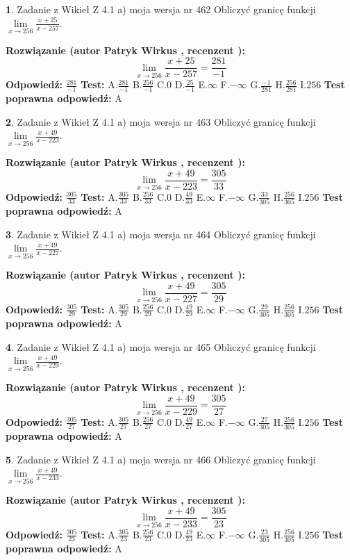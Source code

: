 \documentclass[12pt, a4paper]{article}
\theoremstyle{definition} %
\newtheorem{zad}{}
\newcommand{\zadStart}[1]{\begin{zad}#1\newline}
\newcommand{\zadStop}{\end{zad}}
\newcommand{\rozwStart}[2]{\noindent \textbf{Rozwiązanie (autor #1 , recenzent #2): }\newline}
\newcommand{\rozwStop}{\newline}
\newcommand{\odpStart}{\noindent \textbf{Odpowiedź:}\newline}
\newcommand{\odpStop}{\newline}
\newcommand{\testStart}{\noindent \textbf{Test:}\newline}
\newcommand{\testStop}{\newline}
\newcommand{\kluczStart}{\noindent \textbf{Test poprawna odpowiedź:}\newline}
\newcommand{\kluczStop}{\newline}
\begin{document}
\zadStart{Zadanie z Wikieł Z 4.1 a) moja wersja nr 462}
Obliczyć granicę funkcji $\lim\limits_{x\to256}\frac{x+25}{x-257}$.
\zadStop
\rozwStart{Patryk Wirkus}{}
$$\lim\limits_{x\to256}\frac{x+25}{x-257} = \frac{281}{-1}$$
\rozwStop
\odpStart
$\frac{281}{-1}$
\odpStop
\testStart
A.$\frac{281}{-1}$
B.$\frac{256}{-1}$
C.$0$
D.$\frac{25}{-1}$
E.$\infty$
F.$-\infty$
G.$\frac{-1}{281}$
H.$\frac{256}{281}$
I.$256$
\testStop
\kluczStart
A
\kluczStop



\zadStart{Zadanie z Wikieł Z 4.1 a) moja wersja nr 463}
Obliczyć granicę funkcji $\lim\limits_{x\to256}\frac{x+49}{x-223}$.
\zadStop
\rozwStart{Patryk Wirkus}{}
$$\lim\limits_{x\to256}\frac{x+49}{x-223} = \frac{305}{33}$$
\rozwStop
\odpStart
$\frac{305}{33}$
\odpStop
\testStart
A.$\frac{305}{33}$
B.$\frac{256}{33}$
C.$0$
D.$\frac{49}{33}$
E.$\infty$
F.$-\infty$
G.$\frac{33}{305}$
H.$\frac{256}{305}$
I.$256$
\testStop
\kluczStart
A
\kluczStop



\zadStart{Zadanie z Wikieł Z 4.1 a) moja wersja nr 464}
Obliczyć granicę funkcji $\lim\limits_{x\to256}\frac{x+49}{x-227}$.
\zadStop
\rozwStart{Patryk Wirkus}{}
$$\lim\limits_{x\to256}\frac{x+49}{x-227} = \frac{305}{29}$$
\rozwStop
\odpStart
$\frac{305}{29}$
\odpStop
\testStart
A.$\frac{305}{29}$
B.$\frac{256}{29}$
C.$0$
D.$\frac{49}{29}$
E.$\infty$
F.$-\infty$
G.$\frac{29}{305}$
H.$\frac{256}{305}$
I.$256$
\testStop
\kluczStart
A
\kluczStop



\zadStart{Zadanie z Wikieł Z 4.1 a) moja wersja nr 465}
Obliczyć granicę funkcji $\lim\limits_{x\to256}\frac{x+49}{x-229}$.
\zadStop
\rozwStart{Patryk Wirkus}{}
$$\lim\limits_{x\to256}\frac{x+49}{x-229} = \frac{305}{27}$$
\rozwStop
\odpStart
$\frac{305}{27}$
\odpStop
\testStart
A.$\frac{305}{27}$
B.$\frac{256}{27}$
C.$0$
D.$\frac{49}{27}$
E.$\infty$
F.$-\infty$
G.$\frac{27}{305}$
H.$\frac{256}{305}$
I.$256$
\testStop
\kluczStart
A
\kluczStop



\zadStart{Zadanie z Wikieł Z 4.1 a) moja wersja nr 466}
Obliczyć granicę funkcji $\lim\limits_{x\to256}\frac{x+49}{x-233}$.
\zadStop
\rozwStart{Patryk Wirkus}{}
$$\lim\limits_{x\to256}\frac{x+49}{x-233} = \frac{305}{23}$$
\rozwStop
\odpStart
$\frac{305}{23}$
\odpStop
\testStart
A.$\frac{305}{23}$
B.$\frac{256}{23}$
C.$0$
D.$\frac{49}{23}$
E.$\infty$
F.$-\infty$
G.$\frac{23}{305}$
H.$\frac{256}{305}$
I.$256$
\testStop
\kluczStart
A
\kluczStop
\end{document}
